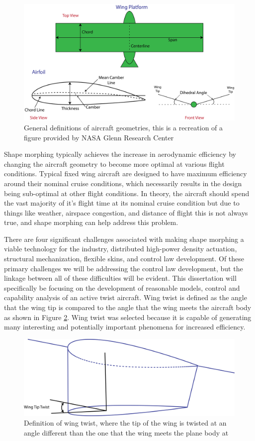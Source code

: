 \documentclass[11pt]{ucthesis}
\begin{document}
\begin{figure}[thpb]
\centering
\includegraphics[width=0.75\linewidth]{./Figures/AirCraftGeometry-01.png}
\caption{General definitions of aircraft geometries, this is a recreation of a figure provided by NASA Glenn Research Center}
\label{fig:airGeo}
\end{figure}

Shape morphing typically achieves the increase in aerodynamic efficiency by changing the aircraft geometry to become more optimal at various flight conditions. Typical fixed wing aircraft are designed to have maximum efficiency around their nominal cruise conditions, which necessarily results in the design being sub-optimal at other flight conditions. In theory, the aircraft should spend the vast majority of it's flight time at its nominal cruise condition but due to things like weather, airspace congestion, and distance of flight this is not always true, and shape morphing can help address this problem.  

There are four significant challenges associated with making shape morphing a viable technology for the industry, distributed high-power density actuation, structural mechanization, flexible skins, and control law development. \cite{reich2007introduction} Of these primary challenges we will be addressing the control law development, but the linkage between all of these difficulties will be evident. This dissertation will specifically be focusing on the development of reasonable models, control and capability analysis of an active twist aircraft. Wing twist is defined as the angle that the wing tip is compared to the angle that the wing meets the aircraft body as shown in Figure \ref{fig:twist}. Wing twist was selected because it is capable of generating many interesting and potentially important phenomena for increased efficiency.

\begin{figure}[thpb]
\centering
\includegraphics[width=0.75\linewidth]{./Figures/WingTipTwist.png}
\caption{Definition of wing twist, where the tip of the wing is twisted at an angle different than the one that the wing meets the plane body at}
\label{fig:twist}
\end{figure}
\end{document}

